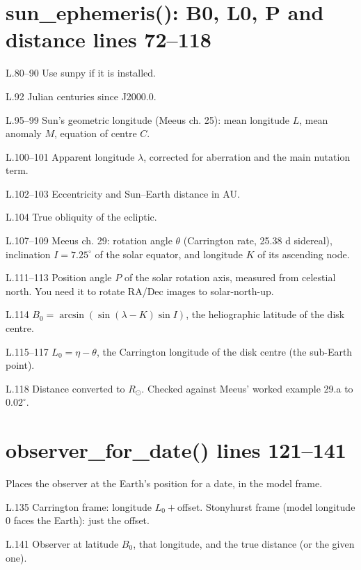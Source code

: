 \section*{\normalsize sun\_ephemeris(): B0, L0, P and distance \hfill{\small\mdseries\color{gray}lines 72--118}}

\begin{lines}
\item[L.80–90] Use sunpy if it is installed.
\item[L.92] Julian centuries since J2000.0.
\item[L.95–99] Sun's geometric longitude (Meeus ch. 25): mean longitude $L$, mean anomaly $M$, equation of centre $C$.
\item[L.100–101] Apparent longitude $\lambda$, corrected for aberration and the main nutation term.
\item[L.102–103] Eccentricity and Sun--Earth distance in AU.
\item[L.104] True obliquity of the ecliptic.
\item[L.107–109] Meeus ch. 29: rotation angle $\theta$ (Carrington rate, 25.38 d sidereal), inclination $I=7.25^\circ$ of the solar equator, and longitude $K$ of its ascending node.
\item[L.111–113] Position angle $P$ of the solar rotation axis, measured from celestial north. You need it to rotate RA/Dec images to solar-north-up.
\item[L.114] $B_0=\arcsin(\sin(\lambda-K)\sin I)$, the heliographic latitude of the disk centre.
\item[L.115–117] $L_0=\eta-\theta$, the Carrington longitude of the disk centre (the sub-Earth point).
\item[L.118] Distance converted to $R_\odot$. Checked against Meeus' worked example 29.a to $0.02^\circ$.
\end{lines}
\section*{\normalsize observer\_for\_date() \hfill{\small\mdseries\color{gray}lines 121--141}}

Places the observer at the Earth's position for a date, in the model frame.

\begin{lines}
\item[L.135] Carrington frame: longitude $L_0+$offset. Stonyhurst frame (model longitude 0 faces the Earth): just the offset.
\item[L.141] Observer at latitude $B_0$, that longitude, and the true distance (or the given one).
\end{lines}
